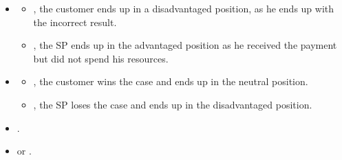 \ActedAbnormallyThen{\customer}


\begin{itemize}
\item \AgreeablePath
  \begin{itemize}
    \item {}, the customer ends up in a disadvantaged position, as he ends up with the incorrect result.
    \item {}, the SP ends up in the advantaged position as he received the payment but did not spend his resources.
  \end{itemize}
\item \DisputePath
  \begin{itemize}
    \item {}, the customer wins the case and ends up in the neutral position.
    \item {}, the SP loses the case and ends up in the disadvantaged position.
  \end{itemize}
\end{itemize}

\Fairness

\begin{itemize}
  \item {}.
  \item \CanDoNothing{}  or . 
\end{itemize}

